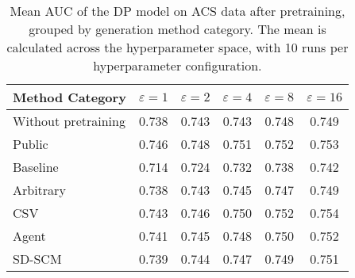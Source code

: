 \begin{table}[h!]
    \centering
    \caption{Mean AUC of the DP model on ACS data after pretraining, grouped by generation method category. The mean is calculated across the hyperparameter space, with 10 runs per hyperparameter configuration.}
    \label{tab:epsilon_comparison}
    \begin{tabular}{lccccc}
    \toprule
    Method Category & $\varepsilon=1$ & $\varepsilon=2$ & $\varepsilon=4$ & $\varepsilon=8$ & $\varepsilon=16$ \\
    \midrule
    Without pretraining & 0.738 & 0.743 & 0.743 & 0.748 & 0.749 \\
    \arrayrulecolor{black!50!}\midrule
    Public & \cellcolor{gold!30}0.746 & \cellcolor{gold!30}0.748 & \cellcolor{gold!30}0.751 & \cellcolor{gold!30}0.752 & \cellcolor{silver!30}0.753 \\
    \arrayrulecolor{black!50!}\midrule
    Baseline & 0.714 & 0.724 & 0.732 & 0.738 & 0.742 \\
    \arrayrulecolor{black!50!}\midrule
    Arbitrary & 0.738 & 0.743 & 0.745 & 0.747 & 0.749 \\
    \arrayrulecolor{black!50!}\midrule
    CSV & \cellcolor{silver!30}0.743 & \cellcolor{silver!30}0.746 & \cellcolor{silver!30}0.750 & \cellcolor{gold!30}0.752 & \cellcolor{gold!30}0.754 \\
    Agent & \cellcolor{bronze!30}0.741 & \cellcolor{bronze!30}0.745 & \cellcolor{bronze!30}0.748 & \cellcolor{silver!30}0.750 & \cellcolor{bronze!30}0.752 \\
    SD-SCM & 0.739 & 0.744 & 0.747 & \cellcolor{bronze!30}0.749 & 0.751 \\
    \bottomrule
    \end{tabular}
\end{table}